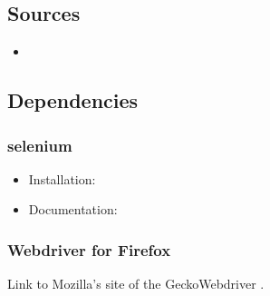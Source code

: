 \documentclass[letterpaper,10pt,english]{sphinxmanual}
\begin{document}
\subsection{Sources}
\label{\detokenize{masterCodeDoc:sources}}\begin{itemize}
\item {} 

\end{itemize}


\subsection{Dependencies}
\label{\detokenize{masterCodeDoc:dependencies}}

\subsubsection{selenium}
\label{\detokenize{masterCodeDoc:selenium}}\begin{itemize}
\item {} 
Installation: 

\item {} 
Documentation: 

\end{itemize}


\subsubsection{Webdriver for Firefox}
\label{\detokenize{masterCodeDoc:webdriver-for-firefox}}
Link to Mozilla’s site of the Gecko\sphinxhyphen{}Webdriver .
\end{document}

